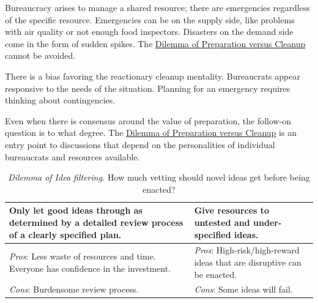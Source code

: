 Bureaucracy arises to manage a shared resource; there are emergencies regardless of the specific resource. Emergencies can be on the supply side, like problems with air quality or not enough food inspectors. Disasters on the demand side come in the form of sudden spikes. The  \hyperref[table:dilemma-personal-emergencies-vs-ignore]{Dilemma of Preparation versus Cleanup} cannot be avoided. 

There is a bias favoring the reactionary cleanup mentality. Bureaucrats appear responsive to the needs of the situation. Planning for an emergency requires thinking about contingencies. 

Even when there is consensus around the value of preparation, the follow-on question is to what degree. 
The \hyperref[table:dilemma-personal-emergencies-vs-ignore]{Dilemma of Preparation versus Cleanup} is an entry point to discussions that depend on the personalities of individual bureaucrats and resources available. 


\begin{center}
\begin{table}[H] %
\begin{tabular}{ | m{\dilemmatablewidth}| m{\dilemmatablewidth} | } 
  \hline
  \textbf{Only let good ideas through as determined by a detailed review process of a clearly specified plan.} &
  \textbf{Give resources to untested and under-specified ideas.} \\
  \hline
  \textit{Pros}: Less waste of resources and time. Everyone has confidence in the investment. & 
  \textit{Pros}: High-risk/high-reward ideas that are disruptive can be enacted. \\
  \hline
  \textit{Cons}: Burdensome review process. & 
  \textit{Cons}: Some ideas will fail. \\
  \hline
\end{tabular}
\caption{
\textit{Dilemma of Idea filtering.}
How much vetting should novel ideas get before being enacted?
}
\label{table:dilemma-personal-idea-filtering}
\end{table}
\end{center}

